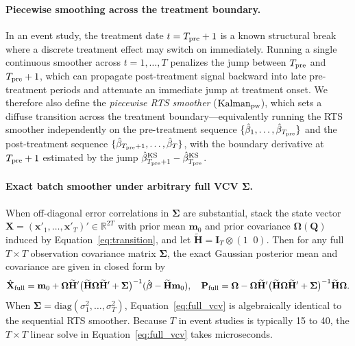 \documentclass[12pt]{article}
\begin{document}
\paragraph{Piecewise smoothing across the treatment boundary.} In an event study, the treatment date $t = T_{\rm pre} + 1$ is a known structural break where a discrete treatment effect may switch on immediately. Running a single continuous smoother across $t = 1, \ldots, T$ penalizes the jump between $T_{\rm pre}$ and $T_{\rm pre}+1$, which can propagate post-treatment signal backward into late pre-treatment periods and attenuate an immediate jump at treatment onset. We therefore also define the \emph{piecewise RTS smoother} ($\text{Kalman}_{\rm pw}$), which sets a diffuse transition across the treatment boundary---equivalently running the RTS smoother independently on the pre-treatment sequence $\{\hat{\beta}_1, \ldots, \hat{\beta}_{T_{\rm pre}}\}$ and the post-treatment sequence $\{\hat{\beta}_{T_{\rm pre}+1}, \ldots, \hat{\beta}_T\}$, with the boundary derivative at $T_{\rm pre}+1$ estimated by the jump $\hat{\beta}^{\rm KS}_{T_{\rm pre}+1} - \hat{\beta}^{\rm KS}_{T_{\rm pre}}$.

\paragraph{Exact batch smoother under arbitrary full VCV $\boldsymbol\Sigma$.} When off-diagonal error correlations in $\boldsymbol\Sigma$ are substantial, stack the state vector $\mathbf{X} = (\mathbf{x}'_1, \ldots, \mathbf{x}'_T)' \in \mathbb{R}^{2T}$ with prior mean $\mathbf{m}_0$ and prior covariance $\boldsymbol\Omega(\mathbf{Q})$ induced by Equation~\eqref{eq:transition}, and let $\widetilde{\mathbf{H}} = \mathbf{I}_T \otimes (1 \;\; 0)$. Then for any full $T \times T$ observation covariance matrix $\boldsymbol\Sigma$, the exact Gaussian posterior mean and covariance are given in closed form by
\begin{equation}\label{eq:full_vcv}
\hat{\mathbf{X}}_{\rm full} = \mathbf{m}_0 + \boldsymbol\Omega \widetilde{\mathbf{H}}' \bigl(\widetilde{\mathbf{H}} \boldsymbol\Omega \widetilde{\mathbf{H}}' + \boldsymbol\Sigma\bigr)^{-1} (\hat{\boldsymbol\beta} - \widetilde{\mathbf{H}}\mathbf{m}_0), \quad
\mathbf{P}_{\rm full} = \boldsymbol\Omega - \boldsymbol\Omega \widetilde{\mathbf{H}}' \bigl(\widetilde{\mathbf{H}} \boldsymbol\Omega \widetilde{\mathbf{H}}' + \boldsymbol\Sigma\bigr)^{-1} \widetilde{\mathbf{H}} \boldsymbol\Omega.
\end{equation}
When $\boldsymbol\Sigma = \text{diag}(\sigma^2_1, \ldots, \sigma^2_T)$, Equation~\eqref{eq:full_vcv} is algebraically identical to the sequential RTS smoother. Because $T$ in event studies is typically 15 to 40, the $T \times T$ linear solve in Equation~\eqref{eq:full_vcv} takes microseconds.
\end{document}
